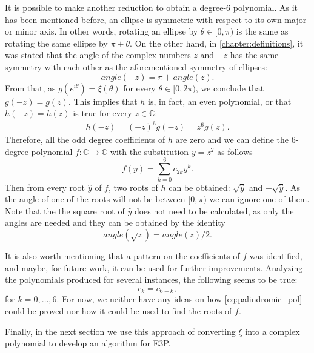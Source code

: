 It is possible to make another reduction to obtain a degree-$6$ polynomial.
As it has been mentioned before, an ellipse is symmetric with respect to its own major or minor axis. 
In other words, rotating an ellipse by $\theta \in [0, \pi)$ is the same as rotating the same ellipse by $\pi + \theta$.
On the other hand, in \autoref{chapter:definitions}, it was stated that the angle of the complex numbers $z$ and $-z$ has the same symmetry with each other as the aforementioned symmetry of ellipses:
\begin{equation*}
angle(-z) = \pi + angle(z).
\end{equation*}
From that, as $g(e^{i\theta})=\xi(\theta)$ for every $\theta \in [0, 2\pi)$, we conclude that $g(-z)=g(z)$. This implies that $h$ is, in fact, an even polynomial, or that $h(-z) = h(z)$ is true for every $z\in\mathbb{C}$:
\begin{align}
h(-z) = (-z)^6g(-z) = z^6g(z).
\end{align}
Therefore, all the odd degree coefficients of $h$ are zero and we can define the $6$-degree polynomial $f : \mathbb{C} \mapsto \mathbb{C}$ with the substitution $y=z^2$ as follows
\begin{equation}
f(y) = \sum_{k=0}^{6} c_{2k} y^k.
\end{equation}
Then from every root $\hat{y}$ of $f$, two roots of $h$ can be obtained: $\sqrt{\hat{y}}$ and $-\sqrt{\hat{y}}$. As the angle of one of the roots will not be between $[0, \pi)$ we can ignore one of them. 
Note that the the square root of $\hat{y}$ does not need to be calculated, as only the angles are needed and they can be obtained by the identity
\begin{equation}
angle(\sqrt{z}) = angle(z)/2.
\end{equation}

It is also worth mentioning that a pattern on the coefficients of $f$ was identified, and maybe, for future work, it can be used for further improvements. Analyzing the polynomials produced for several instances, the following seems to be true:
\begin{equation}\label{eq:palindromic_pol}
c_k = \overline{c_{6-k}},
\end{equation}
for $k=0, \dots, 6$. For now, we neither have any ideas on how \autoref{eq:palindromic_pol} could be proved nor how it could be used to find the roots of $f$.

Finally, in the next section we use this approach of converting $\xi$ into a complex polynomial to develop an algorithm for E3P.

